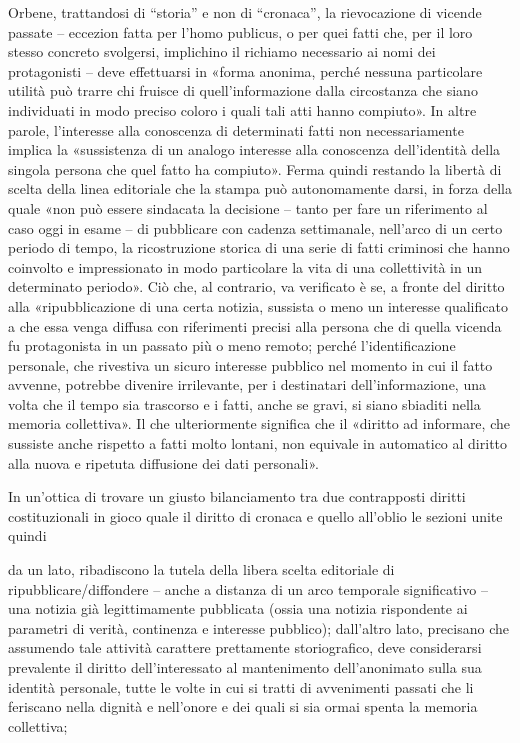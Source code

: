 Orbene, trattandosi di “storia” e non di “cronaca”, la rievocazione di vicende passate – eccezion fatta per l’homo publicus, o per quei fatti che, per il loro stesso concreto svolgersi, implichino il richiamo necessario ai nomi dei protagonisti – deve effettuarsi in «forma anonima, perché nessuna particolare utilità può trarre chi fruisce di quell’informazione dalla circostanza che siano individuati in modo preciso coloro i quali tali atti hanno compiuto». In altre parole, l’interesse alla conoscenza di determinati fatti non necessariamente implica la «sussistenza di un analogo interesse alla conoscenza dell’identità della singola persona che quel fatto ha compiuto». Ferma quindi restando la libertà di scelta della linea editoriale che la stampa può autonomamente darsi, in forza della quale «non può essere sindacata la decisione – tanto per fare un riferimento al caso oggi in esame – di pubblicare con cadenza settimanale, nell’arco di un certo periodo di tempo, la ricostruzione storica di una serie di fatti criminosi che hanno coinvolto e impressionato in modo particolare la vita di una collettività in un determinato periodo». Ciò che, al contrario, va verificato è se, a fronte del diritto alla «ripubblicazione di una certa notizia, sussista o meno un interesse qualificato a che essa venga diffusa con riferimenti precisi alla persona che di quella vicenda fu protagonista in un passato più o meno remoto; perché l’identificazione personale, che rivestiva un sicuro interesse pubblico nel momento in cui il fatto avvenne, potrebbe divenire irrilevante, per i destinatari dell’informazione, una volta che il tempo sia trascorso e i fatti, anche se gravi, si siano sbiaditi nella memoria collettiva». Il che ulteriormente significa che il «diritto ad informare, che sussiste anche rispetto a fatti molto lontani, non equivale in automatico al diritto alla nuova e ripetuta diffusione dei dati personali».

In un’ottica di trovare un giusto bilanciamento tra due contrapposti diritti costituzionali in gioco quale il diritto di cronaca e quello all’oblio le sezioni unite quindi

da un lato, ribadiscono la tutela della libera scelta editoriale di ripubblicare/diffondere – anche a distanza di un arco temporale significativo – una notizia già legittimamente pubblicata (ossia una notizia rispondente ai parametri di verità, continenza e interesse pubblico);
dall’altro lato, precisano che assumendo tale attività carattere prettamente storiografico, deve considerarsi prevalente il diritto dell’interessato al mantenimento dell’anonimato sulla sua identità personale, tutte le volte in cui si tratti di avvenimenti passati che li feriscano nella dignità e nell’onore e dei quali si sia ormai spenta la memoria collettiva;


